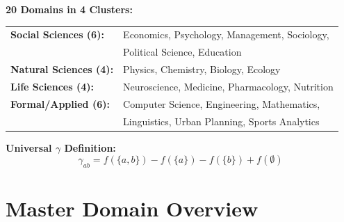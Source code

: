 \begin{tcolorbox}[colback=blue!5!white,colframe=blue!75!black,title=\textbf{Quick Reference: Domain Clusters}]

\textbf{20 Domains in 4 Clusters:}

\begin{tabular}{@{}ll@{}}
\textbf{Social Sciences (6):} & Economics, Psychology, Management, Sociology, \\
& Political Science, Education \\
\textbf{Natural Sciences (4):} & Physics, Chemistry, Biology, Ecology \\
\textbf{Life Sciences (4):} & Neuroscience, Medicine, Pharmacology, Nutrition \\
\textbf{Formal/Applied (6):} & Computer Science, Engineering, Mathematics, \\
& Linguistics, Urban Planning, Sports Analytics \\
\end{tabular}

\textbf{Universal $\gamma$ Definition:}
\begin{equation}
\gamma_{ab} = f(\{a,b\}) - f(\{a\}) - f(\{b\}) + f(\emptyset)
\end{equation}

\end{tcolorbox}

\section{Master Domain Overview}
\label{sec:overview}

